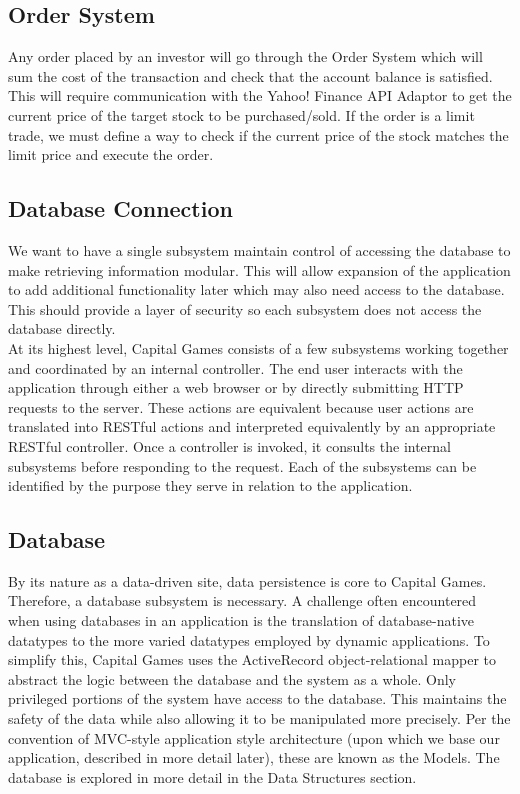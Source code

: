 \subsection{Order System}
Any order placed by an investor will go through the Order System which will
sum the cost of the transaction and check that the account balance is satisfied.
This will require communication with the Yahoo! Finance API Adaptor to get the
current price of the target stock to be purchased/sold. If the order is a limit
trade, we must define a way to check if the current price of the stock matches
the limit price and execute the order.\\

\subsection{Database Connection}
We want to have a single subsystem maintain control of accessing the database
to make retrieving information modular. This will allow expansion of the
application to add additional functionality later which may also need access
to the database. This should provide a layer of security so each subsystem does
not access the database directly.\\


\iffalse
At its highest level, Capital Games consists of a few subsystems
working together and coordinated by an internal controller. The
end user interacts with the application through either a web browser
or by directly submitting HTTP requests to the server. These actions
are equivalent because user actions are translated into RESTful actions
and interpreted equivalently by an appropriate RESTful controller. \cite{wiki:restful}
Once a controller is invoked, it consults the 
internal subsystems before responding to the request. Each of the 
subsystems can be identified by the purpose they serve in relation
to the application. 


\subsection{Database}
By its nature as a data-driven site, data persistence
is core to Capital Games. Therefore, a database subsystem is necessary. 
A challenge often encountered when using databases in an application is
the translation of database-native datatypes to the more varied datatypes
employed by dynamic applications. \cite{wiki:orm} To simplify this,
Capital Games uses the ActiveRecord object-relational mapper to abstract
the logic between the database and the system as a whole. Only privileged portions
of the system have access to the database. This maintains the safety of the
data while also allowing it to be manipulated more precisely. Per the convention
of MVC-style application style architecture 
(upon which we base our application, described in more detail later), these 
are known as the Models. The database is explored in more detail in the Data Structures section.

